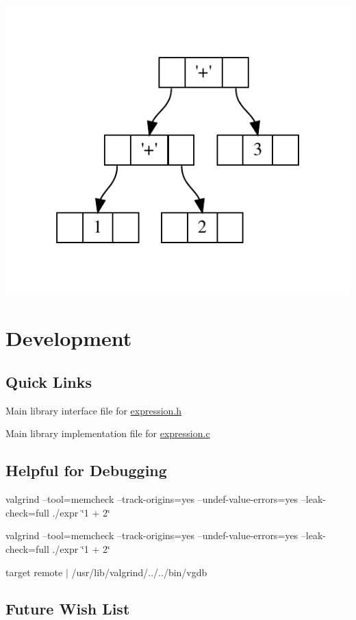 \begin{DoxyImageNoCaption}
  \mbox{\includegraphics[width=\textwidth,height=\textheight/2,keepaspectratio=true]{dot_inline_dotgraph_3}}
\end{DoxyImageNoCaption}
\hypertarget{index_development}{}\section{Development}\label{index_development}
\hypertarget{index_quick_links}{}\subsection{Quick Links}\label{index_quick_links}

\begin{DoxyItemize}
\item Main library interface file for \hyperlink{expression_8h}{expression.\+h}
\item Main library implementation file for \hyperlink{expression_8c}{expression.\+c}
\end{DoxyItemize}\hypertarget{index_debug_info}{}\subsection{Helpful for Debugging}\label{index_debug_info}

\begin{DoxyItemize}
\item valgrind --tool=memcheck --track-\/origins=yes --undef-\/value-\/errors=yes --leak-\/check=full ./expr \char`\"{}1 + 2\char`\"{}
\item valgrind --tool=memcheck --track-\/origins=yes --undef-\/value-\/errors=yes --leak-\/check=full ./expr \char`\"{}1 + 2\char`\"{}
\item target remote $\vert$ /usr/lib/valgrind/../../bin/vgdb
\end{DoxyItemize}\hypertarget{index_future_changes}{}\subsection{Future Wish List}\label{index_future_changes}

